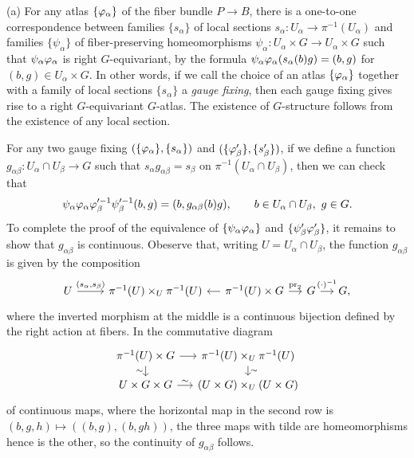 \documentclass{../../large}
\begin{document}
\begin{pf}
(a)
For any atlas $\{\varphi_\alpha\}$ of the fiber bundle $P\to B$, there is a one-to-one correspondence between families $\{s_\alpha\}$ of local sections $s_\alpha:U_\alpha\to\pi^{-1}(U_\alpha)$ and families $\{\psi_\alpha\}$ of fiber-preserving homeomorphisms $\psi_\alpha:U_\alpha\times G\to U_\alpha\times G$ such that $\psi_\alpha\varphi_\alpha$ is right $G$-equivariant, by the formula $\psi_\alpha\varphi_\alpha(s_\alpha(b)g)=(b,g)$ for $(b,g)\in U_\alpha\times G$.
In other words, if we call the choice of an atlas $\{\varphi_\alpha\}$ together with a family of local sections $\{s_\alpha\}$ a \emph{gauge fixing}, then each gauge fixing gives rise to a right $G$-equivariant $G$-atlas.
The existence of $G$-structure follows from the existence of any local section.

For any two gauge fixing $(\{\varphi_\alpha\},\{s_\alpha\})$ and $(\{\varphi_\beta'\},\{s_\beta'\})$, if we define a function $g_{\alpha\beta}:U_\alpha\cap U_\beta\to G$ such that $s_\alpha g_{\alpha\beta}=s_\beta$ on $\pi^{-1}(U_\alpha\cap U_\beta)$, then we can check that
\[\psi_\alpha\varphi_\alpha\varphi_\beta'^{-1}\psi_\beta'^{-1}(b,g)=(b,g_{\alpha\beta}(b)g),\qquad b\in U_\alpha\cap U_\beta,\ g\in G.\]
To complete the proof of the equivalence of $\{\psi_\alpha\varphi_\alpha\}$ and $\{\psi_\beta'\varphi_\beta'\}$, it remains to show that $g_{\alpha\beta}$ is continuous.
Obeserve that, writing $U=U_\alpha\cap U_\beta$, the function $g_{\alpha\beta}$ is given by the composition
\[\begin{tikzcd}[sep=small]
U\ar{rr}{(s_\alpha,s_\beta)}&&\pi^{-1}(U)\times_U\pi^{-1}(U)&\pi^{-1}(U)\times G\lar\rar{\pr_2}& G\rar{(\cdot)^{-1}}&G,
\end{tikzcd}\]
where the inverted morphism at the middle is a continuous bijection defined by the right action at fibers.
In the commutative diagram
\[\begin{tikzcd}[sep=small]
\pi^{-1}(U)\times G \rar\dar[swap]{\sim} & \pi^{-1}(U)\times_U\pi^{-1}(U) \dar{\sim}\\
U\times G\times G \rar{\sim} & (U\times G)\times_U(U\times G)
\end{tikzcd}\]
of continuous maps, where the horizontal map in the second row is $(b,g,h)\mapsto((b,g),(b,gh))$, the three maps with tilde are homeomorphisms hence is the other, so the continuity of $g_{\alpha\beta}$ follows.
\end{pf}
\end{document}
